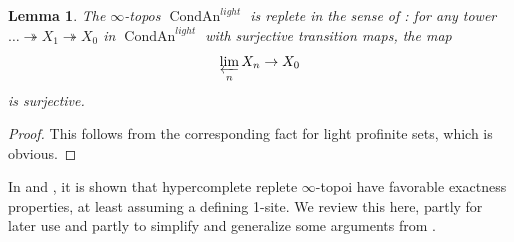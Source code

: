 \documentclass[12pt]{article}
\newtheorem{lemma}[theorem]{Lemma}
\newcommand{\on}{\operatorname}
\begin{document}
\begin{lemma}
The $\infty$-topos $\on{CondAn}^{light}$ is \emph{replete} in the sense of \cite{BhattProEtale}: for any tower $\ldots\twoheadrightarrow X_1\twoheadrightarrow X_0$ in $\on{CondAn}^{light}$ with surjective transition maps, the map
$$\varprojlim_n X_n\rightarrow X_0$$
is surjective.
\end{lemma}
\begin{proof}
This follows from the corresponding fact for light profinite sets, which is obvious.
\end{proof}

In \cite{BhattProEtale} and \cite{MondalReplete}, it is shown that hypercomplete replete $\infty$-topoi have favorable exactness properties, at least assuming a defining 1-site.  We review this here, partly for later use and partly to simplify and generalize some arguments from \cite{MondalReplete}.
\end{document}
